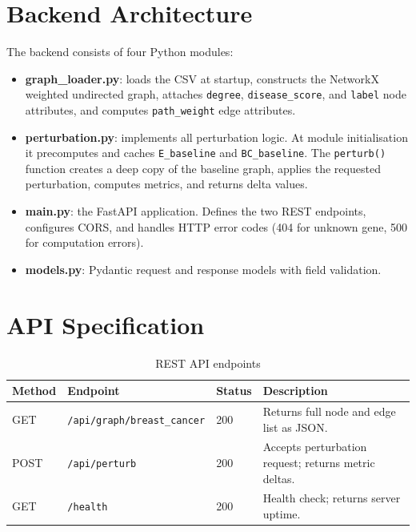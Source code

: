 \documentclass[12pt,a4paper]{report}
\begin{document}
\section{Backend Architecture}

The backend consists of four Python modules:

\begin{itemize}
  \item \textbf{graph\_loader.py}: loads the CSV at startup, constructs the NetworkX weighted undirected graph, attaches \texttt{degree}, \texttt{disease\_score}, and \texttt{label} node attributes, and computes \texttt{path\_weight} edge attributes.
  \item \textbf{perturbation.py}: implements all perturbation logic. At module initialisation it precomputes and caches \texttt{E\_baseline} and \texttt{BC\_baseline}. The \texttt{perturb()} function creates a deep copy of the baseline graph, applies the requested perturbation, computes metrics, and returns delta values.
  \item \textbf{main.py}: the FastAPI application. Defines the two REST endpoints, configures CORS, and handles HTTP error codes (404 for unknown gene, 500 for computation errors).
  \item \textbf{models.py}: Pydantic request and response models with field validation.
\end{itemize}

\section{API Specification}

\begin{table}[H]
  \centering
  \caption{REST API endpoints}
  \label{tab:api}
  \begin{tabularx}{\textwidth}{lllX}
    \toprule
    \textbf{Method} & \textbf{Endpoint} & \textbf{Status} & \textbf{Description} \\
    \midrule
    GET & \texttt{/api/graph/breast\_cancer} & 200 & Returns full node and edge list as JSON. \\
    POST & \texttt{/api/perturb} & 200 & Accepts perturbation request; returns metric deltas. \\
    GET & \texttt{/health} & 200 & Health check; returns server uptime. \\
    \bottomrule
  \end{tabularx}
\end{table}
\end{document}
